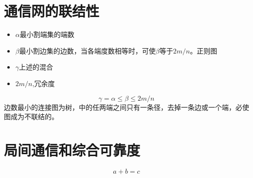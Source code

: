 \section{通信网的联结性
}
\begin{itemize}
	\item $ \alpha $最小割端集的端数
	\item $ \beta $最小割边集的边数，当各端度数相等时，可使$ \beta $等于$ 2m/n $。正则图
	\item $ \gamma $上述的混合
	\item $ 2m/n $,冗余度
\end{itemize}
\begin{equation}\label{key}
\gamma = \alpha \le \beta \le 2m/n
\end{equation}
边数最小的连接图为树，中的任两端之间只有一条径，去掉一条边或一个端，必使图成为不联结的。

\section{局间通信和综合可靠度}




\begin{equation}
a + b = c
\end{equation}